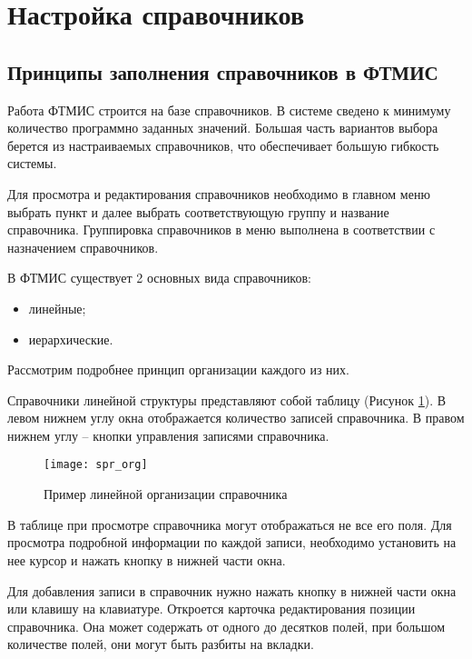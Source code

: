 \newpage
\section{Настройка справочников}

\subsection{Принципы заполнения справочников в ФТМИС}

Работа ФТМИС строится на базе справочников. В системе сведено к минимуму количество программно заданных значений. Большая часть вариантов выбора берется из настраиваемых справочников, что обеспечивает большую гибкость системы.

Для просмотра и редактирования справочников необходимо в главном меню выбрать пункт  и далее выбрать соответствующую группу и название справочника. Группировка справочников в меню выполнена в соответствии с назначением справочников.

В ФТМИС существует 2 основных вида справочников:
\begin{itemize}
 \item линейные;
 \item иерархические.
\end{itemize}

Рассмотрим подробнее принцип организации каждого из них.

Справочники линейной структуры представляют собой таблицу (Рисунок \ref{img_spr_org}). В левом нижнем углу окна отображается количество записей справочника. В правом нижнем углу – кнопки управления записями справочника.

\begin{figure}[ht]\centering
 \texttt{[image: spr\_org]}
 \caption{Пример линейной организации справочника}
 \label{img_spr_org}
\end{figure}

\begin{prim}
 В таблице при просмотре справочника могут отображаться не все его поля. Для просмотра подробной информации по каждой записи, необходимо установить на нее курсор и нажать кнопку   в нижней части окна.
\end{prim}
 
Для добавления записи в справочник нужно нажать кнопку  в нижней части окна или клавишу  на клавиатуре. Откроется карточка редактирования позиции справочника. Она может содержать от одного до десятков полей, при большом количестве полей, они могут быть разбиты на вкладки. 

